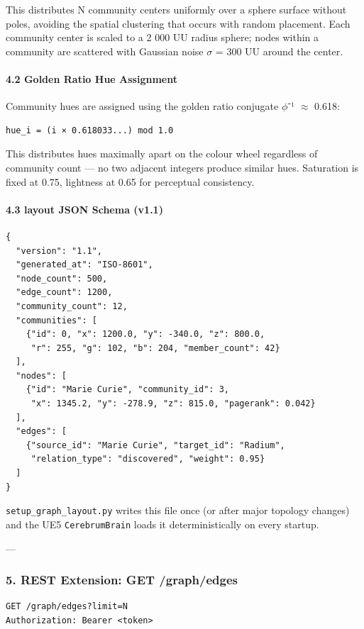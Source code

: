 This distributes N community centers uniformly over a sphere surface without poles, avoiding the spatial clustering that occurs with random placement. Each community center is scaled to a 2 000 UU radius sphere; nodes within a community are scattered with Gaussian noise $\sigma$ = 300 UU around the center.

\paragraph{4.2 Golden Ratio Hue Assignment}

Community hues are assigned using the golden ratio conjugate $\phi$⁻¹ $\approx$ 0.618:

\begin{lstlisting}
hue_i = (i × 0.618033...) mod 1.0
\end{lstlisting}

This distributes hues maximally apart on the colour wheel regardless of community count — no two adjacent integers produce similar hues. Saturation is fixed at 0.75, lightness at 0.65 for perceptual consistency.

\paragraph{4.3 layout JSON Schema (v1.1)}

\begin{lstlisting}
{
  "version": "1.1",
  "generated_at": "ISO-8601",
  "node_count": 500,
  "edge_count": 1200,
  "community_count": 12,
  "communities": [
    {"id": 0, "x": 1200.0, "y": -340.0, "z": 800.0,
     "r": 255, "g": 102, "b": 204, "member_count": 42}
  ],
  "nodes": [
    {"id": "Marie Curie", "community_id": 3,
     "x": 1345.2, "y": -278.9, "z": 815.0, "pagerank": 0.042}
  ],
  "edges": [
    {"source_id": "Marie Curie", "target_id": "Radium",
     "relation_type": "discovered", "weight": 0.95}
  ]
}
\end{lstlisting}

\texttt{setup\_graph\_layout.py} writes this file once (or after major topology changes) and the UE5 \texttt{CerebrumBrain} loads it deter\-ministically on every startup.

---

\subsubsection{5. REST Extension: GET /graph/edges}

\begin{lstlisting}
GET /graph/edges?limit=N
Authorization: Bearer <token>
\end{lstlisting}

